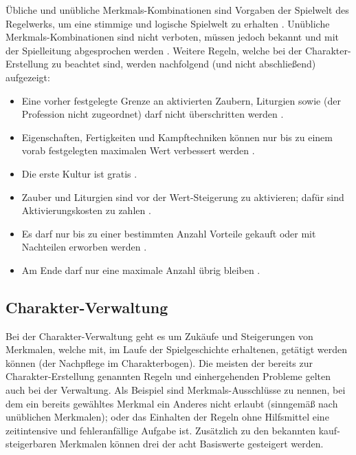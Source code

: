 Übliche und unübliche Merkmals-Kombinationen sind Vorgaben der Spielwelt \bzw des Regelwerks, um eine stimmige und logische Spielwelt zu erhalten .
Unübliche Merkmals-Kombinationen sind nicht verboten, müssen jedoch bekannt und mit der Spielleitung abgesprochen werden .
Weitere Regeln, welche bei der Charakter-Erstellung zu beachtet sind, werden nachfolgend (und nicht abschließend) aufgezeigt:
\begin{itemize}
    \item Eine vorher festgelegte Grenze an aktivierten Zaubern, Liturgien sowie  (der Profession nicht zugeordnet) darf nicht überschritten werden .
    \item Eigenschaften, Fertigkeiten und Kampftechniken können nur bis zu einem vorab festgelegten maximalen Wert verbessert werden .
    \item Die erste Kultur ist gratis .
    \item Zauber und Liturgien sind vor der Wert-Steigerung zu aktivieren; dafür sind Aktivierungskosten zu zahlen .
    \item Es darf nur bis zu einer bestimmten Anzahl  Vorteile gekauft oder mit Nachteilen erworben werden .
    \item Am Ende darf nur eine maximale Anzahl  übrig bleiben .
\end{itemize}


\subsection{Charakter-Verwaltung}\label{subsec:charakter-verwaltung}

Bei der Charakter-Verwaltung geht es um Zukäufe und Steigerungen von Merkmalen, welche mit, im Laufe der Spielgeschichte erhaltenen,  getätigt werden können (\inkl der Nachpflege im Charakterbogen).
Die meisten der bereits zur Charakter-Erstellung genannten Regeln und einhergehenden Probleme gelten auch bei der Verwaltung.
Als Beispiel sind Merkmals-Ausschlüsse zu nennen, bei dem ein bereits gewähltes Merkmal ein Anderes nicht erlaubt (sinngemäß nach unüblichen Merkmalen);
oder das Einhalten der Regeln ohne Hilfsmittel eine zeitintensive und fehleranfällige Aufgabe ist.
Zusätzlich zu den bekannten kauf- \bzw steigerbaren Merkmalen können drei der acht Basiswerte gesteigert werden.

